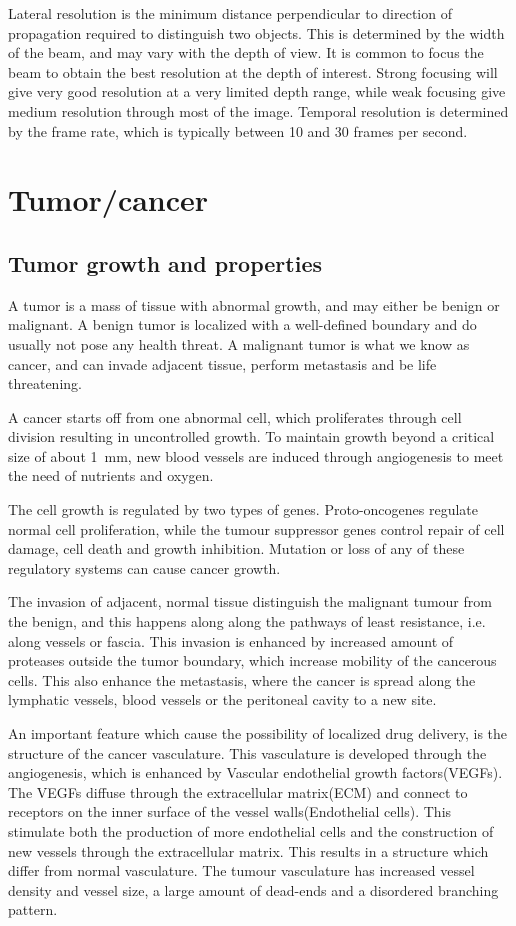 Lateral resolution is the minimum distance perpendicular to direction of propagation required to distinguish two objects. This is determined by the width of the beam, and may vary with the depth of view. It is common to focus the beam to obtain the best resolution at the depth of interest. Strong focusing will give very good resolution at a very limited depth range, while weak focusing give medium resolution through most of the image. Temporal resolution is determined by the frame rate, which is typically between 10 and 30 frames per second. 

\section{Tumor/cancer}
\subsection{Tumor growth and properties}

 A tumor is a mass of tissue with abnormal growth, and may either be benign or malignant. A benign tumor is localized with a  well-defined boundary and do usually not pose any health threat. A malignant tumor is what we know as cancer, and can invade adjacent tissue, perform metastasis and be life threatening. 

A cancer starts off from one abnormal cell, which proliferates through cell division resulting in uncontrolled growth. To maintain growth beyond a critical size of about \SI{1}{\milli\metre}\cite{king2006cancer}, new blood vessels are induced through angiogenesis to meet the need of nutrients and oxygen. 

The cell growth is regulated by two types of genes. Proto-oncogenes regulate normal cell proliferation, while the tumour suppressor genes control repair of cell damage, cell death and growth inhibition. Mutation or loss of any of these regulatory systems can cause cancer growth. 

The invasion of adjacent, normal tissue distinguish the malignant tumour from the benign, and this happens along along the pathways of least resistance, i.e. along vessels or fascia. This invasion is enhanced by increased amount of proteases outside the tumor boundary, which increase mobility of the cancerous cells. This also enhance the metastasis, where the cancer is spread along the lymphatic vessels, blood vessels or the peritoneal cavity to a new site.
 
An important feature which cause the possibility of localized drug delivery, is the structure of the cancer vasculature. This vasculature is developed through the angiogenesis, which is enhanced by Vascular endothelial growth factors(VEGFs). The VEGFs diffuse through the extracellular matrix(ECM) and connect to receptors on the inner surface of the vessel walls(Endothelial cells)\cite{Koumoutsakos2013}. This stimulate both the production of more endothelial cells and the construction of new vessels through the extracellular matrix\cite{Nishida2006}. This results in a structure which differ from normal vasculature. The tumour vasculature has increased vessel density and vessel size, a large amount of dead-ends and a disordered branching pattern.    

